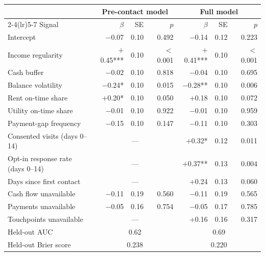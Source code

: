 \begin{tabular}{lrrrrrr}
\toprule
 & \multicolumn{3}{c}{Pre-contact model} & \multicolumn{3}{c}{Full model} \\
\cmidrule(lr){2-4}\cmidrule(lr){5-7}
Signal & $\beta$ & SE & $p$ & $\beta$ & SE & $p$ \\
\midrule
Intercept & $-$0.07 & 0.10 & 0.492 & $-$0.14 & 0.12 & 0.223 \\
Income regularity & $+$0.45*** & 0.10 & $<$0.001 & $+$0.41*** & 0.10 & $<$0.001 \\
Cash buffer & $-$0.02 & 0.10 & 0.818 & $-$0.04 & 0.10 & 0.695 \\
Balance volatility & $-$0.24* & 0.10 & 0.015 & $-$0.28** & 0.10 & 0.006 \\
Rent on-time share & $+$0.20* & 0.10 & 0.050 & $+$0.18 & 0.10 & 0.072 \\
Utility on-time share & $-$0.01 & 0.10 & 0.922 & $-$0.01 & 0.10 & 0.959 \\
Payment-gap frequency & $-$0.15 & 0.10 & 0.147 & $-$0.11 & 0.10 & 0.303 \\
Consented visits (days 0--14) & \multicolumn{3}{c}{---} & $+$0.32* & 0.12 & 0.011 \\
Opt-in response rate (days 0--14) & \multicolumn{3}{c}{---} & $+$0.37** & 0.13 & 0.004 \\
Days since first contact & \multicolumn{3}{c}{---} & $+$0.24 & 0.13 & 0.060 \\
Cash flow unavailable & $-$0.11 & 0.19 & 0.560 & $-$0.11 & 0.19 & 0.565 \\
Payments unavailable & $-$0.05 & 0.16 & 0.754 & $-$0.05 & 0.17 & 0.785 \\
Touchpoints unavailable & \multicolumn{3}{c}{---} & $+$0.16 & 0.16 & 0.317 \\
\midrule
Held-out AUC & \multicolumn{3}{c}{0.62} & \multicolumn{3}{c}{0.69} \\
Held-out Brier score & \multicolumn{3}{c}{0.238} & \multicolumn{3}{c}{0.220} \\
\bottomrule
\end{tabular}
